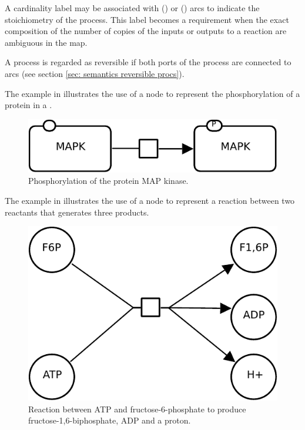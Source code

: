 A cardinality label may be associated with  () or  () arcs to indicate the stoichiometry of the process.  This label becomes a requirement when the exact composition of the number of copies of the inputs or outputs to a reaction are ambiguous in the map.

A process is regarded as reversible if both ports of the process are connected to  arcs (see section \ref{sec: semantics reversible procs}).

The example in  illustrates the use of a  node to represent the phosphorylation of a protein in a \PD.

\begin{figure}[H]
  \centering
  \includegraphics[scale = 0.8]{images/build/process_phosphorylation_example.pdf}
  \caption{Phosphorylation of the protein MAP kinase.}
  \label{fig:trans-phos}
\end{figure}

The example in  illustrates the use of a  node to represent a reaction between two reactants that generates three products. 

\begin{figure}[H]
  \centering
  \includegraphics[scale = 0.8]{images/build/process_reaction_example.pdf}
  \caption{Reaction between ATP and fructose-6-phosphate to produce fructose-1,6-biphosphate, ADP and a proton.}
  \label{fig:trans-react}
\end{figure}

